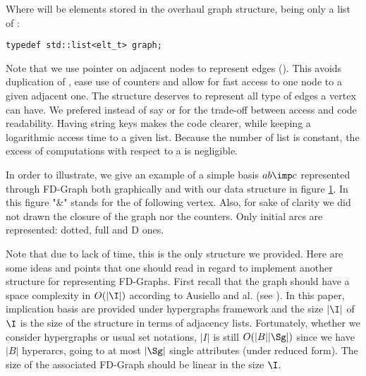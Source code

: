 \noindent Where  will be elements stored in the overhaul graph 
structure, being only a list of :

\begin{lstlisting}[language=CoreCpp, style=Light, breaklines=true]
typedef std::list<elt_t> graph;
\end{lstlisting}

\noindent Note that we use pointer on adjacent nodes to represent edges 
(). This avoids duplication of , ease use 
of counters and allow for fast access to one node to a given adjacent one. The 
 structure deserves to represent all type of edges a vertex can have.
We prefered  instead of say  or  for the 
trade-off between access and code readability. Having string keys makes the code
clearer, while keeping a logarithmic access time to a given list. Because the 
number of list is constant, the excess of computations with respect to a 
 is negligible. 

\vspace{1.2em}

In order to illustrate, we give an example of a simple basis $ab \imp c$ 
represented through FD-Graph both graphically and with our data structure in
figure \ref{fig:Graph-DS}. In this figure "\&" stands for the 
of following vertex. Also, for sake of clarity we did not drawn the closure of 
the graph nor the counters. Only initial arcs are represented: dotted, full and 
D ones. 
 

\begin{figure}[ht]
	
	\label{fig:Graph-DS}
\end{figure}

Note that due to lack of time, this is the only structure we provided. Here are
some ideas and points that one should read in regard to implement another 
structure for representing FD-Graphs. First recall that the graph should have
a space complexity in $O(|\I|)$ according to Ausiello and al. (see 
\cite{ausiello_minimal_1986}). In this paper, implication basis are provided
under hypergraphs framework and the size $|\I|$ of $\I$ is the size of the 
structure in terms of adjacency lists. Fortunately, whether we consider 
hypergraphs or usual set notations, $|I|$ is still $O(|B||\Sg|)$ since we 
have $|B|$ hyperarcs, going to at most $|\Sg|$ single attributes (under reduced
form). The size of the associated FD-Graph should be linear in the size $\I$.

